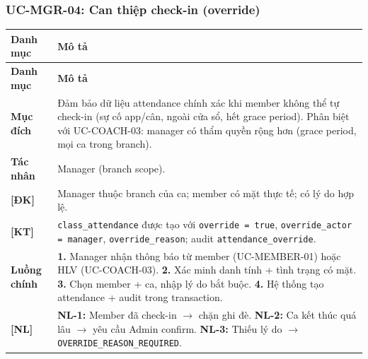\subsubsection{UC-MGR-04: Can thiệp check-in (override)}
\begingroup
\renewcommand{\arraystretch}{1.3}
\begin{longtable}{|>{\centering\arraybackslash}m{3cm}|>{\raggedright\arraybackslash}m{12cm}|}
\hline
\textbf{Danh mục} & \textbf{Mô tả} \\ \hline
\endfirsthead
\hline
\textbf{Danh mục} & \textbf{Mô tả} \\ \hline
\endhead
\hline
\endfoot
\textbf{Mục đích} & Đảm bảo dữ liệu attendance chính xác khi member không thể tự check-in (sự cố app/cân, ngoài cửa sổ, hết grace period). Phân biệt với UC-COACH-03: manager có thẩm quyền rộng hơn (grace period, mọi ca trong branch). \\
\hline
\textbf{Tác nhân} & Manager (branch scope). \\
\hline
\textbf{[ĐK]} & Manager thuộc branch của ca; member có mặt thực tế; có lý do hợp lệ. \\
\hline
\textbf{[KT]} & \texttt{class\_attendance} được tạo với \texttt{override = true}, \texttt{override\_actor = manager}, \texttt{override\_reason}; audit \texttt{attendance\_override}. \\
\hline
\textbf{Luồng chính} & \textbf{1.} Manager nhận thông báo từ member (UC-MEMBER-01) hoặc HLV (UC-COACH-03). \textbf{2.} Xác minh danh tính + tình trạng có mặt. \textbf{3.} Chọn member + ca, nhập lý do bắt buộc. \textbf{4.} Hệ thống tạo attendance + audit trong transaction. \\
\hline
\textbf{[NL]} & \textbf{NL-1:} Member đã check-in $\rightarrow$ chặn ghi đè. \textbf{NL-2:} Ca kết thúc quá lâu $\rightarrow$ yêu cầu Admin confirm. \textbf{NL-3:} Thiếu lý do $\rightarrow$ \texttt{OVERRIDE\_REASON\_REQUIRED}. \\
\hline
\end{longtable}
\endgroup

